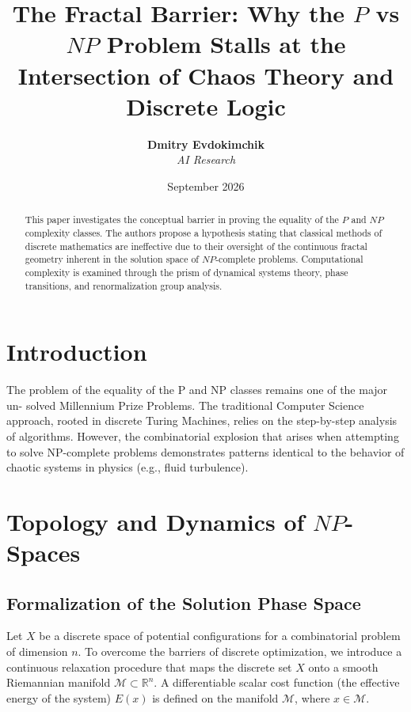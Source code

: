 \documentclass[12pt,a4paper]{article}
\title{\textbf{The Fractal Barrier: Why the $P$ vs $NP$ Problem Stalls at the Intersection of Chaos Theory and Discrete Logic}}
\author{\textbf{Dmitry Evdokimchik} \\ 
\textit{AI Research}}
\date{September 2026}
\begin{document}
\maketitle

\begin{abstract}
This paper investigates the conceptual barrier in proving the equality of the $P$ and $NP$ complexity classes. The authors propose a hypothesis stating that classical methods of discrete mathematics are ineffective due to their oversight of the continuous fractal geometry inherent in the solution space of $NP$-complete problems. Computational complexity is examined through the prism of dynamical systems theory, phase transitions, and renormalization group analysis.
\end{abstract}

\section{Introduction}

The problem of the equality of the P and NP classes remains one of the major un-
solved Millennium Prize Problems. The traditional Computer Science approach, rooted
in discrete Turing Machines, relies on the step-by-step analysis of algorithms. However,
the combinatorial explosion that arises when attempting to solve NP-complete problems
demonstrates patterns identical to the behavior of chaotic systems in physics (e.g., fluid
turbulence).


\section{Topology and Dynamics of $NP$-Spaces}

\subsection{Formalization of the Solution Phase Space}

Let $X$ be a discrete space of potential configurations for a combinatorial problem of dimension $n$. To overcome the barriers of discrete optimization, we introduce a continuous relaxation procedure that maps the discrete set $X$ onto a smooth Riemannian manifold $\mathcal{M} \subset \mathbb{R}^n$. A differentiable scalar cost function (the effective energy of the system) $E(x)$ is defined on the manifold $\mathcal{M}$, where $x \in \mathcal{M}$.
\end{document}
